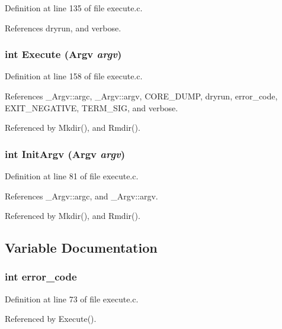 Definition at line 135 of file execute.c.

References dryrun, and verbose.
\subsubsection{\setlength{\rightskip}{0pt plus 5cm}int Execute (\bf{Argv} {\em argv})}\label{execute_8h_cef232b3eab001306f4955864e58114a}




Definition at line 158 of file execute.c.

References \_\-Argv::argc, \_\-Argv::argv, CORE\_\-DUMP, dryrun, error\_\-code, EXIT\_\-NEGATIVE, TERM\_\-SIG, and verbose.

Referenced by Mkdir(), and Rmdir().
\subsubsection{\setlength{\rightskip}{0pt plus 5cm}int Init\-Argv (\bf{Argv} {\em argv})}\label{execute_8h_440737c200f81511186927865ee87383}




Definition at line 81 of file execute.c.

References \_\-Argv::argc, and \_\-Argv::argv.

Referenced by Mkdir(), and Rmdir().

\subsection{Variable Documentation}
\subsubsection{\setlength{\rightskip}{0pt plus 5cm}int \bf{error\_\-code}}\label{execute_8h_7d16b1c68c87cec009d972e79abfba78}




Definition at line 73 of file execute.c.

Referenced by Execute().